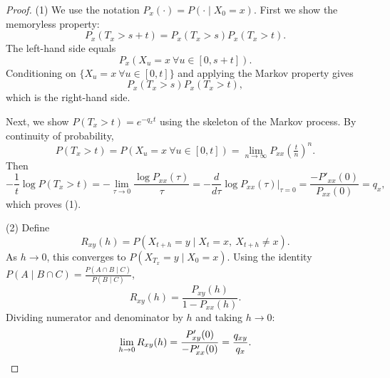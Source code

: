 \documentclass{ximera}
\begin{document}
\begin{proof}
(1) We use the notation $P_x(\cdot) = P(\cdot \mid X_0 = x)$. First we show the memoryless property:
\[
P_x(T_x > s + t) = P_x(T_x > s) P_x(T_x > t).
\]
The left-hand side equals
\[
P_x(X_u = x\ \forall u \in [0, s+t]).
\]
Conditioning on $\{X_u = x\ \forall u \in [0,t]\}$ and applying the Markov property gives
\[
P_x(T_x > s) P_x(T_x > t),
\]
which is the right-hand side.

Next, we show $P(T_x > t) = e^{-q_x t}$ using the skeleton of the Markov process. By continuity of probability,
\[
P(T_x > t) = P(X_u = x\ \forall u \in [0,t]) = \lim_{n \to \infty} P_{xx}\!\left(\tfrac{t}{n}\right)^n.
\]
Then
\[
-\frac{1}{t} \log P(T_x > t) = -\lim_{\tau \to 0} \frac{\log P_{xx}(\tau)}{\tau} = -\frac{d}{d\tau}\log P_{xx}(\tau)\Big|_{\tau=0} = \frac{-P'_{xx}(0)}{P_{xx}(0)} = q_x,
\]
which proves (1).

(2) Define
\[
R_{xy}(h) = P(X_{t+h} = y \mid X_t = x,\ X_{t+h} \neq x).
\]
As $h \to 0$, this converges to $P(X_{T_x} = y \mid X_0 = x)$. Using the identity $P(A \mid B \cap C) = \frac{P(A \cap B \mid C)}{P(B \mid C)}$,
\[
R_{xy}(h) = \frac{P_{xy}(h)}{1 - P_{xx}(h)}.
\]
Dividing numerator and denominator by $h$ and taking $h \to 0$:
\[
\lim_{h \to 0} R_{xy}(h) = \frac{P'_{xy}(0)}{-P'_{xx}(0)} = \frac{q_{xy}}{q_x}. \qedhere
\]
\end{proof}
\end{document}
